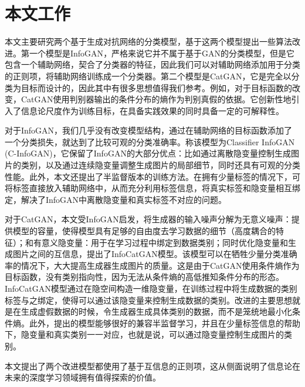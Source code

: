 \section{本文工作}
本文主要研究两个基于生成对抗网络的分类模型，基于这两个模型提出一些算法改进。第一个模型是InfoGAN\cite{chen2016infogan}，严格来说它并不属于基于GAN的分类模型，但是它包含一个辅助网络，契合了分类器的特征，因此我们可以对辅助网络添加用于分类的正则项，将辅助网络训练成一个分类器。第二个模型是CatGAN\cite{springenberg2015unsupervised}，它是完全以分类为目标而设计的，因此其中有很多思想值得我们参考。例如，对于目标函数的改变，CatGAN使用判别器输出的条件分布的熵作为判别真假的依据。它创新性地引入了信息论尺度作为训练目标，在具备实践效果的同时具备一定的可解释性。

对于InfoGAN，我们几乎没有改变模型结构，通过在辅助网络的目标函数添加了一个分类损失，就达到了比较可观的分类准确率。称该模型为Classifier InfoGAN (C-InfoGAN)，它保留了InfoGAN的大部分优点：比如通过离散隐变量控制生成图片的类别，以及通过连续隐变量调整生成图片的局部细节，同时还具有可观的分类性能。此外，本文还提出了半监督版本的训练方法。在拥有少量标签的情况下，可将标签直接放入辅助网络中，从而充分利用标签信息，将真实标签和隐变量相互绑定，解决了InfoGAN中离散隐变量和真实标签不对应的问题。

对于CatGAN，本文受InfoGAN启发，将生成器的输入噪声分解为无意义噪声：提供模型的容量，使得模型具有足够的自由度去学习数据的细节（高度耦合的特征）；和有意义隐变量：用于在学习过程中绑定到数据类别；同时优化隐变量和生成图片之间的互信息，提出了InfoCatGAN模型。该模型可以在牺牲少量分类准确率的情况下，大大提高生成器生成图片的质量。这是由于CatGAN使用条件熵作为目标函数，没有类别指向性，因为无法从条件熵的高低推知条件分布的形态。InfoCatGAN模型通过在隐空间构造一维隐变量，在训练过程中将生成数据的类别标签与之绑定，使得可以通过该隐变量来控制生成数据的类别。改进的主要思想就是在生成虚假数据的时候，令生成器生成具体类别的数据，而不是笼统地最小化条件熵。此外，提出的模型能够很好的兼容半监督学习，并且在少量标签信息的帮助下，隐变量和真实类别一一对应，也就是说，可以通过隐变量控制生成图片的类别。

本文提出了两个改进模型都使用了基于互信息的正则项，这从侧面说明了信息论在未来的深度学习领域拥有值得探索的价值。

